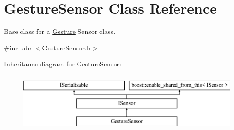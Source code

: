 \hypertarget{class_gesture_sensor}{}\section{Gesture\+Sensor Class Reference}
\label{class_gesture_sensor}


Base class for a \hyperlink{class_gesture}{Gesture} Sensor class.  




{\ttfamily \#include $<$Gesture\+Sensor.\+h$>$}

Inheritance diagram for Gesture\+Sensor\+:\begin{figure}[H]
\begin{center}
\leavevmode
\includegraphics[height=3.000000cm]{class_gesture_sensor}
\end{center}
\end{figure}
